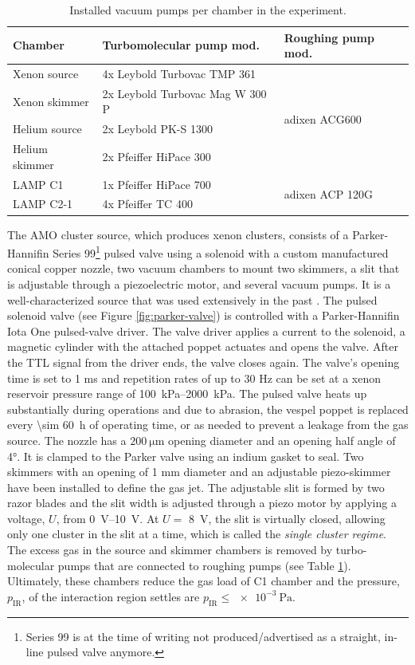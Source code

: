 \begin{table}
	\centering
\begin{tabular}{ | l | l | l | }
\hline
	\textbf{Chamber} & \textbf{Turbomolecular pump mod.} & \textbf{Roughing pump mod.} \\ \hline
	Xenon source & 4x Leybold Turbovac TMP 361 & \multirow{4}{*}{adixen ACG600} \\ 
	Xenon skimmer & 2x Leybold Turbovac Mag W 300 P &  \\ 
	Helium source & 2x Leybold PK-S 1300 & \\ 
	Helium skimmer & 2x Pfeiffer HiPace 300 & \\ \hline
	LAMP C1 & 1x Pfeiffer HiPace 700 & \multirow{2}{*}{adixen ACP 120G} \\ 
	LAMP C2-1 & 4x Pfeiffer TC 400 & \\ \hline
\end{tabular}
\caption[Installed vacuum pumps in the experiment.]{Installed vacuum pumps per chamber in the experiment.}
\label{tab:vacuum-table}
\end{table}
The AMO cluster source, which produces xenon clusters, consists of a Parker-Hannifin Series 99\footnote{Series 99 is at the time of writing not produced/advertised as a straight, in-line pulsed valve anymore.} pulsed valve using a solenoid with a custom manufactured conical copper nozzle, two vacuum chambers to mount two skimmers, a slit that is adjustable through a piezoelectric motor, and several vacuum pumps. It is a well-characterized source that was used extensively in the past \citep{Ferguson-2016-SciAdv,Ferguson-2015-JSR,Gorkhover-2012-PRL,Gorkhover-2016-NatPho,Rupp-2014-JCP}. The pulsed solenoid valve (see Figure \ref{fig:parker-valve}) is controlled with a Parker-Hannifin Iota One pulsed-valve driver. The valve driver applies a current to the solenoid, a magnetic cylinder with the attached poppet actuates and opens the valve. After the TTL signal from the driver ends, the valve closes again. The valve's opening time is set to 1 ms and repetition rates of up to $30$ Hz can be set at a xenon reservoir pressure range of \SIrange{100}{2000}{\kilo\pascal}. The pulsed valve heats up substantially during operations and due to abrasion, the vespel poppet is replaced every \SI{\sim 60}{\hour} of operating time, or as needed to prevent a leakage from the gas source. The nozzle has a $\SI{200}{\micro\meter}$ opening diameter and an opening half angle of \ang{4}. It is clamped to the Parker valve using an indium gasket to seal. Two skimmers with an opening of 1 mm diameter and an adjustable piezo-skimmer have been installed to define the gas jet. The adjustable slit is formed by two razor blades and the slit width is adjusted through a piezo motor by applying a voltage, $U$, from \SIrange{0}{10}{\volt}. At $U=$ \SI{8}{\volt}, the slit is virtually closed, allowing only one cluster in the slit at a time, which is called the \textit{single cluster regime}. The excess gas in the source and skimmer chambers is removed by turbo-molecular pumps that are connected to roughing pumps (see Table \ref{tab:vacuum-table}). Ultimately, these chambers reduce the gas load of C1 chamber and the pressure, $p_{\text{IR}}$, of the interaction region settles are $p_{\text{IR}}\leq \SI{e-3}{\pascal}$.\\[1\baselineskip]

